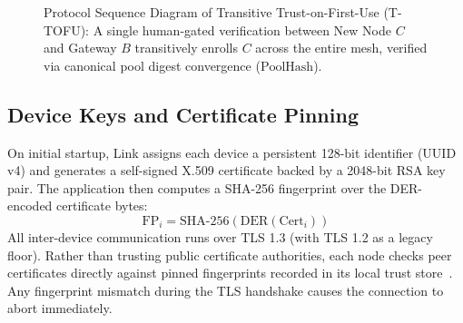 \documentclass[conference]{IEEEtran}
\begin{document}
\begin{figure}[t]
\caption{Protocol Sequence Diagram of Transitive Trust-on-First-Use (T-TOFU): A single human-gated verification between New Node $C$ and Gateway $B$ transitively enrolls $C$ across the entire mesh, verified via canonical pool digest convergence ($\text{PoolHash}$).}
\label{fig:protocol_flow}
\end{figure}

\subsection{Device Keys and Certificate Pinning}
On initial startup, Link assigns each device a persistent 128-bit identifier (UUID v4) and generates a self-signed X.509 certificate backed by a 2048-bit RSA key pair. The application then computes a SHA-256 fingerprint over the DER-encoded certificate bytes:
\begin{equation}
    \text{FP}_i = \text{SHA-256}(\text{DER}(\text{Cert}_i))
\end{equation}
All inter-device communication runs over TLS 1.3 (with TLS 1.2 as a legacy floor). Rather than trusting public certificate authorities, each node checks peer certificates directly against pinned fingerprints recorded in its local trust store~\cite{pradeep2022pinning}. Any fingerprint mismatch during the TLS handshake causes the connection to abort immediately.
\end{document}
